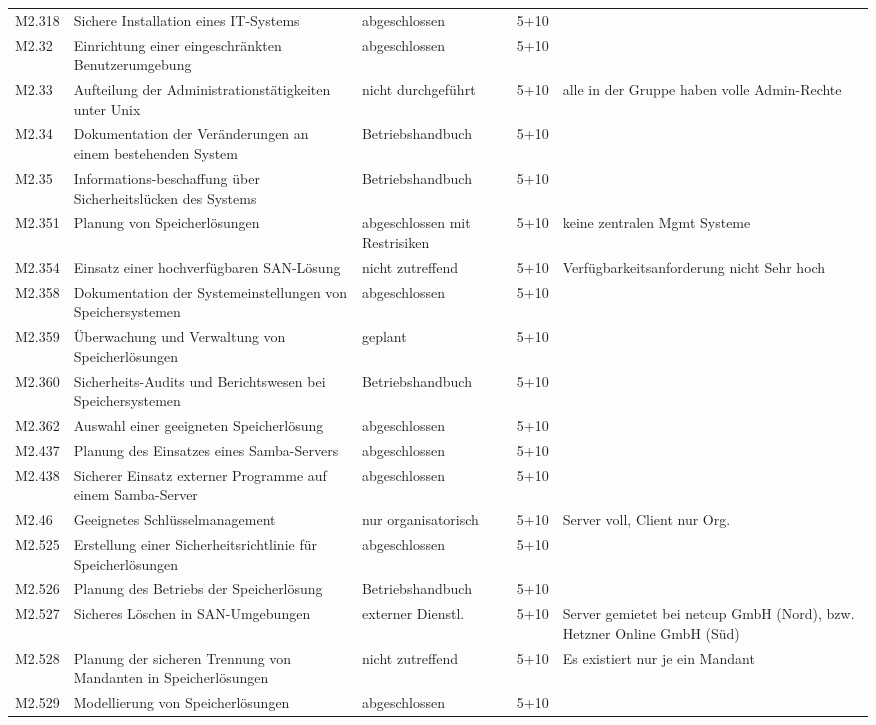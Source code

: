 \begin{longtable}{lp{3.7cm}|p{3cm}l|p{3.8cm}}
M2.318 & Sichere Installation eines IT-Systems & abgeschlossen & 5+10 &  \\
M2.32 & Einrichtung einer eingeschränkten Benutzerumgebung & abgeschlossen & 5+10 &  \\
M2.33 & Aufteilung der Administrationstätigkeiten unter Unix & nicht durchgeführt & 5+10 & alle in der Gruppe haben volle Admin-Rechte \\
M2.34 & Dokumentation der Veränderungen an einem bestehenden System & Betriebshandbuch & 5+10 &  \\
M2.35 & Informations-beschaffung über Sicherheitslücken des Systems & Betriebshandbuch & 5+10 &  \\
M2.351 & Planung von Speicherlösungen & abgeschlossen mit Restrisiken & 5+10 & keine zentralen Mgmt Systeme \\
M2.354 & Einsatz einer hochverfügbaren SAN-Lösung & nicht zutreffend & 5+10 & Verfügbarkeitsanforderung nicht Sehr hoch \\
M2.358 & Dokumentation der Systemeinstellungen von Speichersystemen & abgeschlossen & 5+10 &  \\
M2.359 & Überwachung und Verwaltung von Speicherlösungen & geplant & 5+10 &  \\
M2.360 & Sicherheits-Audits und Berichtswesen bei Speichersystemen & Betriebshandbuch & 5+10 &  \\
M2.362 & Auswahl einer geeigneten Speicherlösung & abgeschlossen & 5+10 &  \\
M2.437 & Planung des Einsatzes eines Samba-Servers & abgeschlossen & 5+10 &  \\
M2.438 & Sicherer Einsatz externer Programme auf einem Samba-Server & abgeschlossen & 5+10 &  \\
M2.46 & Geeignetes Schlüsselmanagement & nur organisatorisch & 5+10 & Server voll, Client nur Org. \\
M2.525 & Erstellung einer Sicherheitsrichtlinie für Speicherlösungen & abgeschlossen & 5+10 &  \\
M2.526 & Planung des Betriebs der Speicherlösung & Betriebshandbuch & 5+10 &  \\
M2.527 & Sicheres Löschen in SAN-Umgebungen & externer Dienstl. & 5+10 & Server gemietet bei netcup GmbH (Nord), bzw. Hetzner Online GmbH (Süd) \\
M2.528 & Planung der sicheren Trennung von Mandanten in Speicherlösungen & nicht zutreffend & 5+10 & Es existiert nur je ein Mandant \\
M2.529 & Modellierung von Speicherlösungen & abgeschlossen & 5+10 &  \\

\end{longtable}
